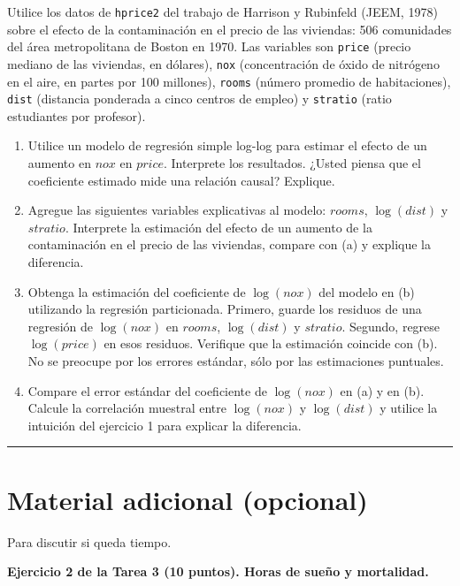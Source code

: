 \documentclass[letterpaper,11pt]{article}
\begin{document}
Utilice los datos de \texttt{hprice2} del trabajo de Harrison y Rubinfeld (JEEM, 1978) sobre
el efecto de la contaminación en el precio de las viviendas: 506 comunidades del área
metropolitana de Boston en 1970. Las variables son \texttt{price} (precio mediano de las
viviendas, en dólares), \texttt{nox} (concentración de óxido de nitrógeno en el aire, en
partes por 100 millones), \texttt{rooms} (número promedio de habitaciones), \texttt{dist}
(distancia ponderada a cinco centros de empleo) y \texttt{stratio} (ratio estudiantes por
profesor).
\begin{enumerate}
    \item Utilice un modelo de regresión simple log-log para estimar el efecto de un aumento en
    $nox$ en $price$. Interprete los resultados. ¿Usted piensa que el coeficiente estimado mide
    una relación causal? Explique.
    \item Agregue las siguientes variables explicativas al modelo: $rooms$, $\log(dist)$ y
    $stratio$. Interprete la estimación del efecto de un aumento de la contaminación en el
    precio de las viviendas, compare con (a) y explique la diferencia.
    \item Obtenga la estimación del coeficiente de $\log(nox)$ del modelo en (b) utilizando la
    regresión particionada. Primero, guarde los residuos de una regresión de $\log(nox)$ en
    $rooms$, $\log(dist)$ y $stratio$. Segundo, regrese $\log(price)$ en esos residuos.
    Verifique que la estimación coincide con (b). No se preocupe por los errores estándar,
    sólo por las estimaciones puntuales.
    \item Compare el error estándar del coeficiente de $\log(nox)$ en (a) y en (b). Calcule la
    correlación muestral entre $\log(nox)$ y $\log(dist)$ y utilice la intuición del ejercicio 1
    para explicar la diferencia.
\end{enumerate}

\vspace{2em}
\noindent\rule{\textwidth}{0.4pt}

\section*{Material adicional (opcional)}

\noindent Para discutir si queda tiempo.

\vspace{1em}

\noindent\textbf{Ejercicio 2 de la Tarea 3 (10 puntos). Horas de sueño y mortalidad.}
\end{document}
